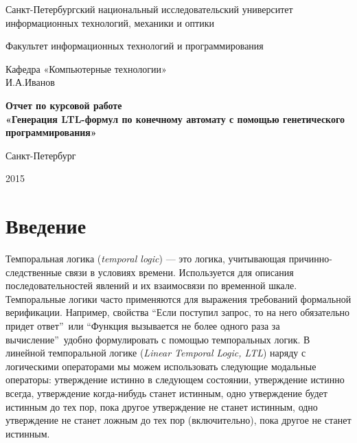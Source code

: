 \documentclass[12pt,fleqn]{article}
\begin{document}
\begin{titlepage}

\begin{center}
{\large
Санкт-Петербургский национальный исследовательский университет информационных технологий, механики и оптики

Факультет информационных технологий и программирования

Кафедра «Компьютерные технологии»\\[3cm]

И.А.Иванов\\[2cm]}

{\large \bfseries
Отчет по курсовой работе\\[0.5cm]

«Генерация LTL-формул по конечному автомату с помощью генетического программирования»
}
\vfill

Санкт-Петербург

2015
\end{center}

\end{titlepage}

\tableofcontents

\section{Введение}

Темпоральная логика (\emph{temporal logic}) \cite{tl} --- это логика, учитывающая причинно-следственные связи в условиях времени.
Используется для описания последовательностей явлений и их взаимосвязи по временной шкале.
Темпоральные логики часто применяются для выражения требований формальной верификации.
Например, свойства ``Если поступил запрос, то на него обязательно придет ответ''\ или
``Функция вызывается не более одного раза за вычисление''\ удобно формулировать с помощью темпоральных логик.
В линейной темпоральной логике (\emph{Linear Temporal Logic, LTL}) наряду с логическими операторами мы можем 
использовать следующие модальные операторы: утверждение истинно в следующем состоянии,
утверждение истинно всегда, утверждение когда-нибудь станет истинным,
одно утверждение будет истинным до тех пор, пока другое утверждение не станет истинным,
одно утверждение не станет ложным до тех пор (включительно), пока другое не станет истинным.
\end{document}
